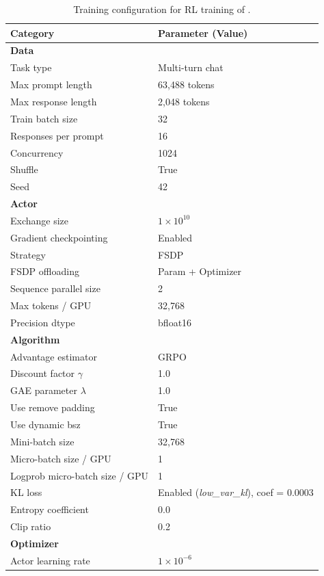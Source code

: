 \begin{table}[h!]
\centering
\caption{Training configuration for RL training of \model.}
\renewcommand\arraystretch{1.2}
\label{tab:training_details}
\begin{tabular}{ll}
\hline
\textbf{Category} & \textbf{Parameter (Value)} \\
\hline
\multicolumn{2}{l}{\textbf{Data}} \\
Task type & Multi-turn chat \\
Max prompt length & 63,488 tokens \\
Max response length & 2,048 tokens \\
Train batch size & 32 \\
Responses per prompt & 16 \\
Concurrency & 1024 \\
Shuffle & True \\
Seed & 42 \\
\hline
\multicolumn{2}{l}{\textbf{Actor}} \\
Exchange size & $1\times10^{10}$ \\
Gradient checkpointing & Enabled \\
Strategy & FSDP \\
FSDP offloading & Param + Optimizer \\
Sequence parallel size & 2 \\
Max tokens / GPU & 32,768 \\
Precision dtype & bfloat16 \\
\hline
\multicolumn{2}{l}{\textbf{Algorithm}} \\
Advantage estimator & GRPO \\
Discount factor $\gamma$ & 1.0 \\
GAE parameter $\lambda$ & 1.0 \\
Use remove padding & True \\
Use dynamic bsz & True \\
Mini-batch size & 32,768 \\
Micro-batch size / GPU & 1 \\
Logprob micro-batch size / GPU & 1 \\
KL loss & Enabled (\textit{low\_var\_kl}), coef = 0.0003 \\
Entropy coefficient & 0.0 \\
Clip ratio & 0.2 \\
\hline
\multicolumn{2}{l}{\textbf{Optimizer}} \\
Actor learning rate & $1\times10^{-6}$ \\

\end{tabular}
\end{table}
